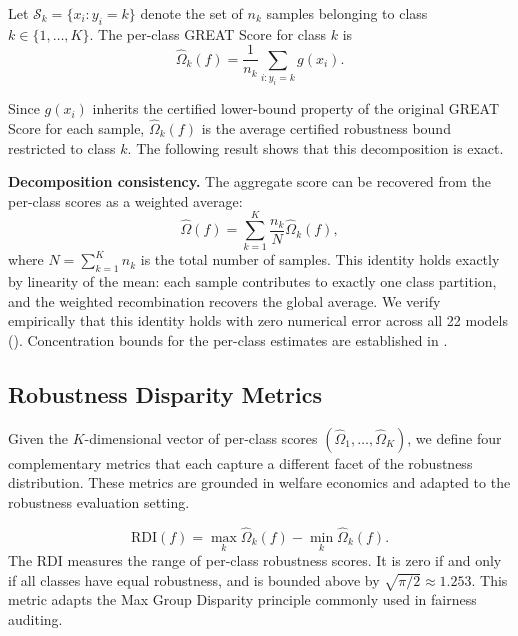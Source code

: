 \begin{definition}
\label{def:per_class}
Let $\mathcal{S}_k = \{x_i : y_i = k\}$ denote the set of $n_k$ samples belonging to class $k \in \{1, \ldots, K\}$. The per-class GREAT Score for class $k$ is
\begin{equation}
    \hat{\Omega}_k(f) = \frac{1}{n_k} \sum_{i : y_i = k} g(x_i).
    \label{eq:per_class_score}
\end{equation}
\end{definition}

Since $g(x_i)$ inherits the certified lower-bound property of the original GREAT Score for each sample, $\hat{\Omega}_k(f)$ is the average certified robustness bound restricted to class $k$. The following result shows that this decomposition is exact.

\textbf{Decomposition consistency.} The aggregate score can be recovered from the per-class scores as a weighted average:
\begin{equation}
    \hat{\Omega}(f) = \sum_{k=1}^{K} \frac{n_k}{N} \hat{\Omega}_k(f),
    \label{eq:decomposition}
\end{equation}
where $N = \sum_{k=1}^{K} n_k$ is the total number of samples. This identity holds exactly by linearity of the mean: each sample contributes to exactly one class partition, and the weighted recombination recovers the global average. We verify empirically that this identity holds with zero numerical error across all 22 models (). Concentration bounds for the per-class estimates are established in .

\subsection{Robustness Disparity Metrics}
\label{sec:metrics}

Given the $K$-dimensional vector of per-class scores $(\hat{\Omega}_1, \ldots, \hat{\Omega}_K)$, we define four complementary metrics that each capture a different facet of the robustness distribution. These metrics are grounded in welfare economics and adapted to the robustness evaluation setting.

\begin{definition}
\label{def:rdi}
\begin{equation}
    \mathrm{RDI}(f) = \max_{k} \hat{\Omega}_k(f) - \min_{k} \hat{\Omega}_k(f).
    \label{eq:rdi}
\end{equation}
The RDI measures the range of per-class robustness scores. It is zero if and only if all classes have equal robustness, and is bounded above by $\sqrt{\pi/2} \approx 1.253$. This metric adapts the Max Group Disparity principle commonly used in fairness auditing.
\end{definition}

